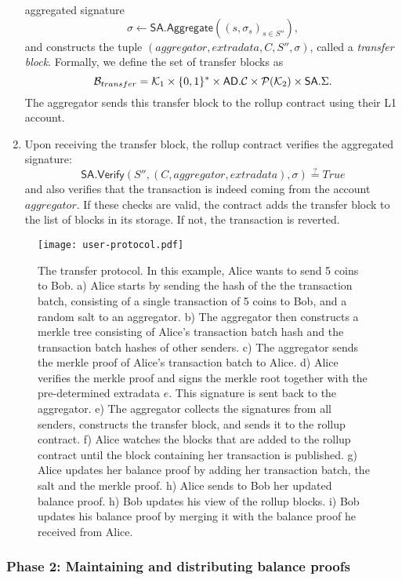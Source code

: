 \begin{enumerate}
    aggregated signature \[\sigma \leftarrow
    \mathsf{SA.Aggregate}((s,\sigma_s)_{s \in S''}),\] and constructs
    the tuple \((aggregator,extradata,C,S'',\sigma)\), called a
    \emph{transfer block}. Formally, we define the set of transfer
    blocks \href{https://github.com/\repo
    FVIntmax/Block.lean#L25}{\ExternalLink}as \[\mathcal{B}_{transfer} = \mathcal{K}_1
      \times \{0,1\}^* \times \mathsf{AD}.\mathcal{C} \times \mathcal{P}(\mathcal{K}_2)
    \times \mathsf{SA}.\Sigma.\]
    The aggregator sends this transfer block to the rollup contract
    using their L1 account.
  \item Upon receiving the transfer block, the rollup contract
    verifies the aggregated signature:
    \[\mathsf{SA.Verify}(S'',(C,aggregator,extradata),\sigma)
    \stackrel{?}{=} True\] and also verifies that the transaction is
    indeed coming from the account \(aggregator\). If these checks
    are valid, the contract adds the transfer block to the list of
    blocks in its storage. If not, the transaction is reverted.
\end{enumerate}

\begin{figure}

  \centering
  \texttt{[image: user-protocol.pdf]}
  \caption{The transfer protocol. In this example, Alice wants to send
  5 coins to Bob. a) Alice starts by sending the hash of the the
  transaction batch, consisting of a single transaction of 5 coins to
Bob, and a random salt to an aggregator. b) The aggregator then
constructs a merkle tree consisting of Alice's transaction batch hash
and the transaction batch hashes of other senders. c) The aggregator
sends the merkle proof of Alice's transaction batch to Alice. d)
Alice verifies the merkle proof and signs the merkle root together
with the pre-determined extradata \(e\). This signature is sent back
to the aggregator. e) The aggregator collects the signatures from all
senders, constructs the transfer block, and sends it to the rollup
contract. f) Alice watches the blocks that are added to the rollup
contract until the block containing her transaction is published. g)
Alice updates her balance proof by adding her transaction batch, the
salt and the merkle proof. h) Alice sends to Bob her updated balance
proof. h) Bob updates his view of the rollup blocks. i) Bob updates
his balance proof by merging it with the balance proof he received from Alice.}
\label{fig:user-protocol}
\end{figure}

\subsubsection{Phase 2: Maintaining and distributing balance proofs}

